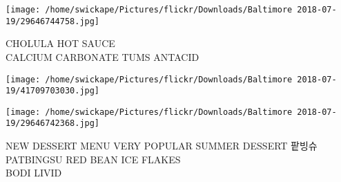 \documentclass[10pt,letterpaper]{article}
\begin{document}
\vspace{0.25in}
\texttt{[image: /home/swickape/Pictures/flickr/Downloads/Baltimore 2018-07-19/29646744758.jpg]}

CHOLULA HOT SAUCE\\
CALCIUM CARBONATE TUMS ANTACID
\pagebreak

\texttt{[image: /home/swickape/Pictures/flickr/Downloads/Baltimore 2018-07-19/41709703030.jpg]}

\vspace{0.25in}
\texttt{[image: /home/swickape/Pictures/flickr/Downloads/Baltimore 2018-07-19/29646742368.jpg]}

NEW DESSERT MENU VERY POPULAR SUMMER DESSERT 팥빙슈 PATBINGSU RED BEAN ICE FLAKES\\
BODI LIVID
\pagebreak
\end{document}
